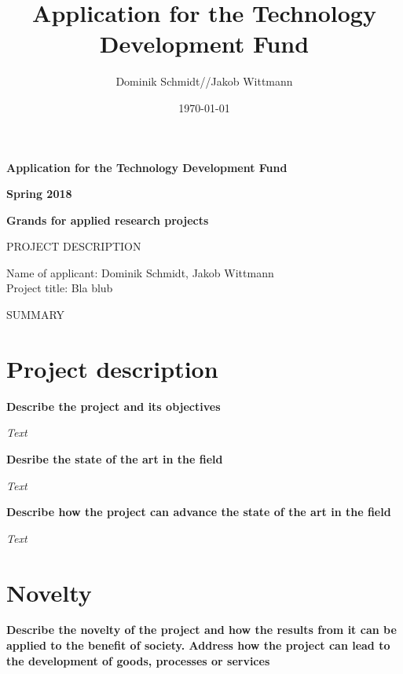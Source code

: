 \documentclass[11pt]{article} %
\title{Application for the Technology Development Fund}
\date{\today}
\author{Dominik Schmidt//Jakob Wittmann}
\begin{document}



\begin{titlepage}

\begin{center}
\LARGE{\textbf{Application for the Technology Development Fund}}

\large{\textbf{Spring 2018}}
\vspace{1.5cm}

\large{\textbf{Grands for applied research projects}}
\end{center}
\vspace{2cm}

\noindent
\large{PROJECT DESCRIPTION}
\vspace{5cm}

\noindent
Name of applicant: Dominik Schmidt, Jakob Wittmann\\
Project title: Bla blub
\vspace{2cm}

\noindent
\large{SUMMARY}

 
\end{titlepage}


\section{Project description}

\noindent
\textbf{Describe the project and its objectives}

\noindent
\textit{Text}

\noindent
\textbf{Desribe the state of the art in the field}

\noindent
\textit{Text}

\noindent
\textbf{Describe how the project can advance the state of the art in the field}

\noindent
\textit{Text}

\section{Novelty}

\noindent
\textbf{Describe the novelty of the project and how the results from it can be applied to the benefit of society. Address how the project can lead to the development of goods, processes or services}
\end{document}
